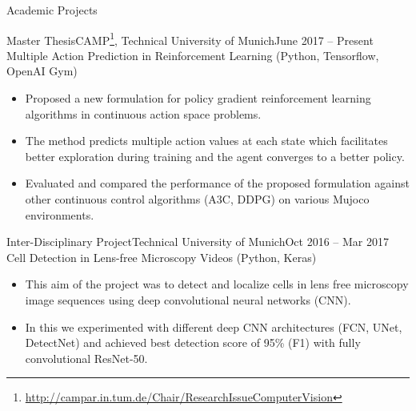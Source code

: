 \documentclass[]{mcdowellcv}
\begin{document}
	\makeheader
	
	\begin{cvsection}{Academic Projects}
	\begin{cvsubsection}[2]{Master Thesis}{CAMP\footnote{\href{http://campar.in.tum.de/Chair/ResearchIssueComputerVision}{http://campar.in.tum.de/Chair/ResearchIssueComputerVision}}, Technical University of Munich}{June 2017 -- Present}
    Multiple Action Prediction in Reinforcement Learning (Python, Tensorflow, OpenAI Gym) \cite{anonymous2018predicting}
        \begin{itemize}
	        \item Proposed a new formulation for policy gradient reinforcement learning algorithms in continuous action space problems.
	        \item The method predicts multiple action values at each state which facilitates better exploration during training and the agent converges to a better policy.
	        \item Evaluated and compared the performance of the proposed formulation against other continuous control algorithms (A3C, DDPG) on various Mujoco environments.
	    \end{itemize}
	\end{cvsubsection}
	
	\begin{cvsubsection}{Inter-Disciplinary Project}{Technical University of Munich}{Oct 2016 -- Mar 2017}
	Cell Detection in Lens-free Microscopy Videos (Python, Keras) \cite{rempfler-2017}
    	\begin{itemize}
    	\item This aim of the project was to detect and localize cells in lens free microscopy image sequences using deep convolutional neural networks (CNN).
        \item In this we experimented with different deep CNN architectures (FCN, UNet, DetectNet) and achieved best detection score of 95\% (F1) with fully convolutional ResNet-50.
    	\end{itemize}
	\end{cvsubsection}
	
	\end{cvsection}
	
\end{document}

